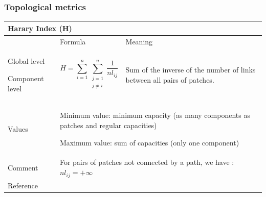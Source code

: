 \documentclass{article}
\begin{document}
\subsubsection{Topological metrics}

\begin{table}[H]
\begin{tabular}{|m{3.24cm}|m{4.4810004cm}m{7.924cm}|}
\hline
\multicolumn{3}{|m{16.044998cm}|}{Harary Index (H)}\\\hline
 &
\multicolumn{1}{m{4.4810004cm}|}{Formula} &
Meaning\\\hline
Global level

Component level &
\multicolumn{1}{m{4.4810004cm}|}{\begin{equation*}
H=\sum _{i=1}^{n}{\sum
_{\begin{matrix}j=1\\j{\neq}i\end{matrix}}^{n}{\frac{1}{{\mathit{nl}}_{\mathit{ij}}}}}
\end{equation*}
} &
Sum of the inverse of the number of links between all pairs of patches.

\\\hline
Values &
\multicolumn{2}{m{12.6050005cm}|}{Minimum value: minimum capacity (as
many components as patches and regular capacities)

Maximum value: sum of capacities (only one component)

}\\\hline
Comment &
\multicolumn{2}{m{12.6050005cm}|}{For pairs of patches not connected by
a path, we have :   ${\mathit{nl}}_{\mathit{ij}}=+{\infty}$}\\\hline
Reference &
\multicolumn{2}{m{12.6050005cm}|}{\cite{Ricotta2000}}\\\hline
\end{tabular}
\end{table}
\end{document}
